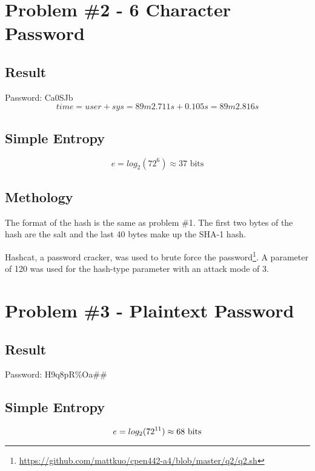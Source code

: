 \documentclass[conference]{IEEEtran}
\begin{document}
\section{Problem \#2 - 6 Character Password}

\subsection{Result}
  \noindent Password: Ca0SJb
  \begin{displaymath}
  time = user + sys = 89m2.711s + 0.105s = 89m2.816s
  \end{displaymath}

\subsection{Simple Entropy}
  \begin{displaymath}
    e = log_2(72^6) \approx 37 \mbox{ bits}
  \end{displaymath}

\subsection{Methology}

The format of the hash is the same as problem \#1. The first two bytes of the
hash are the salt and the last 40 bytes make up the SHA-1 hash.

Hashcat, a password cracker, was used to brute force the
password\footnote{\url{https://github.com/mattkuo/cpen442-a4/blob/master/q2/q2.sh}}.
A parameter of 120 was used for the hash-type parameter with an attack mode of
3.

\section{Problem \#3 - Plaintext Password}
\subsection{Result}
  \noindent Password: H9q8pR\%Oa\#\#

\subsection{Simple Entropy}
  \begin{displaymath}
    e = log_2(72^{11}) \approx 68 \mbox{ bits}\\
  \end{displaymath}
\end{document}
